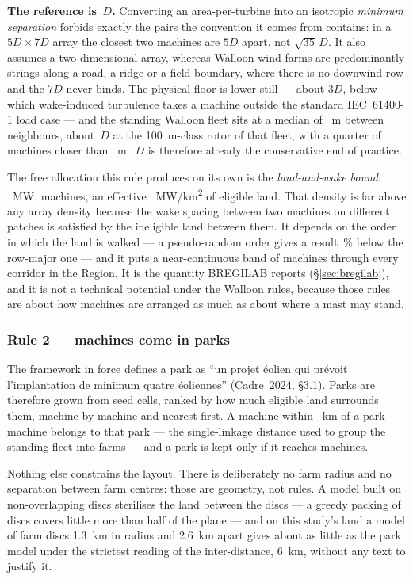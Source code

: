 \documentclass[11pt,a4paper]{article}
\begin{document}
\textbf{The reference is \SpCrossD{}\,$D$.} Converting an area-per-turbine into
an isotropic \emph{minimum separation} forbids exactly the pairs the convention
it comes from contains: in a $5D\times7D$ array the closest two machines are
$5D$ apart, not $\sqrt{35}\,D$. It also assumes a two-dimensional array, whereas
Walloon wind farms are predominantly strings along a road, a ridge or a field
boundary, where there is no downwind row and the $7D$ never binds. The physical
floor is lower still --- about $3D$, below which wake-induced turbulence takes a
machine outside the standard IEC~61400-1 load case --- and the standing Walloon
fleet sits at a median of \FleetMachineNNPFifty{}~m between neighbours, about
\SpObsD{}\,$D$ at the \SI{100}{\metre}-class rotor of that fleet, with a quarter
of machines closer than \FleetMachineNNPTwentyFive{}~m. \SpCrossD{}\,$D$ is
therefore already the conservative end of practice.

The free allocation this rule produces on its own is the \emph{land-and-wake
bound}: \FreePnom{}~MW, \FreeTurbines{} machines, an effective
\FreeDensity{}~MW/\si{\square\kilo\metre} of eligible land. That density is far
above any array density because the wake spacing between two machines on
different patches is satisfied by the ineligible land between them. It depends
on the order in which the land is walked --- a pseudo-random order gives a
result \FreeOrderSpread{}\,\% below the row-major one --- and it puts a
near-continuous band of machines through every corridor in the Region. It is
the quantity BREGILAB reports (§\ref{sec:bregilab}), and it is not a technical
potential under the Walloon rules, because those rules are about how machines
are arranged as much as about where a mast may stand.

\subsubsection{Rule 2 --- machines come in parks}

The framework in force defines a park as ``un projet éolien qui prévoit
l'implantation de minimum quatre éoliennes'' (Cadre~2024, §3.1). Parks are
therefore grown from seed cells, ranked by how much eligible land surrounds
them, machine by machine and nearest-first. A machine within
\PlaceLink{}~km of a park machine belongs to that park --- the single-linkage
distance used to group the standing fleet into farms --- and a park is kept only
if it reaches \PlaceMinTurbines{} machines.

Nothing else constrains the layout. There is deliberately no farm radius and no
separation between farm centres: those are geometry, not rules. A model built on
non-overlapping discs sterilises the land between the discs --- a greedy packing
of discs covers little more than half of the plane --- and on this study's land a
model of farm discs \SI{1.3}{\kilo\metre} in radius and \SI{2.6}{\kilo\metre}
apart gives about as little as the park model under the strictest reading of the
inter-distance, 6~km, without any text to justify it.
\end{document}
